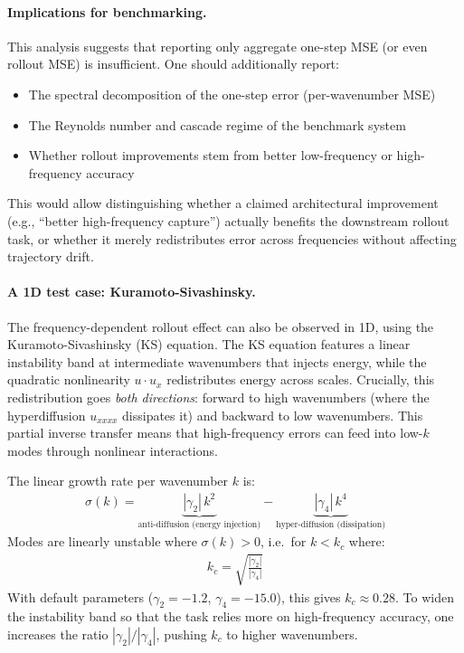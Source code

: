 \documentclass{article}
\begin{document}
\paragraph{Implications for benchmarking.} This analysis suggests that reporting only aggregate one-step MSE (or even rollout MSE) is insufficient. One should additionally report:
\begin{itemize}
    \item The spectral decomposition of the one-step error (per-wavenumber MSE)
    \item The Reynolds number and cascade regime of the benchmark system
    \item Whether rollout improvements stem from better low-frequency or high-frequency accuracy
\end{itemize}
This would allow distinguishing whether a claimed architectural improvement (e.g., ``better high-frequency capture'') actually benefits the downstream rollout task, or whether it merely redistributes error across frequencies without affecting trajectory drift.

\paragraph{A 1D test case: Kuramoto-Sivashinsky.} The frequency-dependent rollout effect can also be observed in 1D, using the Kuramoto-Sivashinsky (KS) equation. The KS equation features a linear instability band at intermediate wavenumbers that injects energy, while the quadratic nonlinearity $u \cdot u_x$ redistributes energy across scales. Crucially, this redistribution goes \textit{both directions}: forward to high wavenumbers (where the hyperdiffusion $u_{xxxx}$ dissipates it) and backward to low wavenumbers. This partial inverse transfer means that high-frequency errors can feed into low-$k$ modes through nonlinear interactions.

The linear growth rate per wavenumber $k$ is:
\begin{align}
    \sigma(k) = \underbrace{|\gamma_2| \, k^2}_{\text{anti-diffusion (energy injection)}} - \underbrace{|\gamma_4| \, k^4}_{\text{hyper-diffusion (dissipation)}}
\end{align}
Modes are linearly unstable where $\sigma(k) > 0$, i.e.\ for $k < k_c$ where:
\begin{align}
    k_c = \sqrt{\frac{|\gamma_2|}{|\gamma_4|}}
\end{align}
With default parameters ($\gamma_2 = -1.2$, $\gamma_4 = -15.0$), this gives $k_c \approx 0.28$. To widen the instability band so that the task relies more on high-frequency accuracy, one increases the ratio $|\gamma_2|/|\gamma_4|$, pushing $k_c$ to higher wavenumbers.
\end{document}
